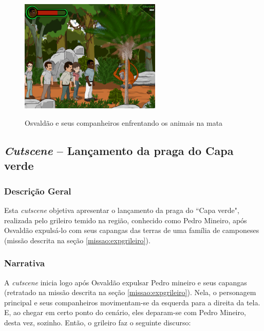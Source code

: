 \begin{figure}[H]
	\centering
	\caption{Osvaldão e seus companheiros enfrentando os animais na mata}
	\includegraphics[width=0.6\textwidth]{figuras/osvaldo_equipe_fase2.png}
	\label{fig:osvaldo_equipe_fase2}
	{}
\end{figure}

\subsection{\textit{Cutscene} -- Lançamento da praga do Capa verde}

\subsubsection{Descrição Geral}

Esta \textit{cutscene} objetiva apresentar o lançamento da praga do ``Capa verde", realizada pelo grileiro temido na região, conhecido como Pedro Mineiro, após Osvaldão expulsá-lo com seus capangas das terras de uma família de camponeses (missão descrita na seção \ref{missao:expgrileiro}).

\subsubsection{Narrativa}

A \textit{cutscene} inicia logo após Osvaldão expulsar Pedro mineiro e seus capangas (retratado na missão descrita na seção \ref{missao:expgrileiro}). Nela, o personagem principal e seus companheiros movimentam-se da esquerda para a direita da tela. E, ao chegar em certo ponto do cenário, eles deparam-se com Pedro Mineiro, desta vez, sozinho. Então, o grileiro faz o seguinte discurso:

